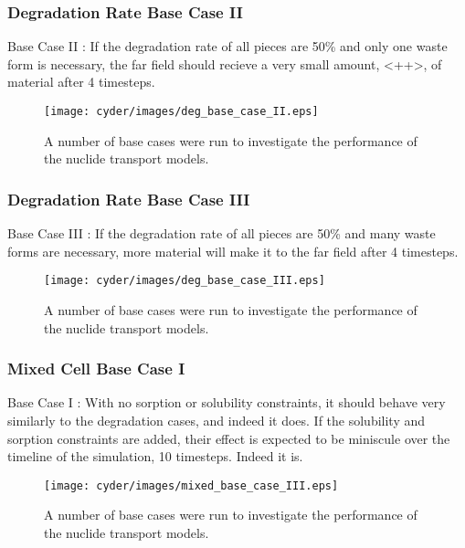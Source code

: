 \begin{frame}
\begin{itemaize}
\begin{frame}
  \frametitle{Degradation Rate Base Case II}
  Base Case II : If the degradation rate of all pieces are 50\% and only one 
  waste form is necessary, the far field should recieve a very small amount, 
  <++>, of material after 4 timesteps.

  \begin{figure}[htbp!]
    \begin{center}
      \texttt{[image: cyder/images/deg\_base\_case\_II.eps]}
      \caption{A number of base cases were run to investigate the performance of 
      the nuclide transport models.}
    \end{center}
  \end{figure}
\end{frame}

\begin{frame}
  \frametitle{Degradation Rate Base Case III}
  Base Case III : If the degradation rate of all pieces are 50\% and many waste 
  forms are necessary, more material will make it to the far field after 4 
  timesteps.

  \begin{figure}[htbp!]
    \begin{center}
      \texttt{[image: cyder/images/deg\_base\_case\_III.eps]}
      \caption{A number of base cases were run to investigate the performance of 
      the nuclide transport models.}
    \end{center}
  \end{figure}
\end{frame}

\begin{frame}
  \frametitle{Mixed Cell Base Case I}
  Base Case I : With no sorption or solubility constraints, it should behave very similarly to 
  the degradation cases, and indeed it does. If the solubility and sorption 
  constraints are added, their effect is expected to be miniscule over the 
  timeline of the simulation, 10 timesteps. Indeed it is. 

  \begin{figure}[htbp!]
    \begin{center}
      \texttt{[image: cyder/images/mixed\_base\_case\_III.eps]}
      \caption{A number of base cases were run to investigate the performance of 
      the nuclide transport models.}
    \end{center}
  \end{figure}
\end{frame}



\end{itemaize}
\end{frame}
